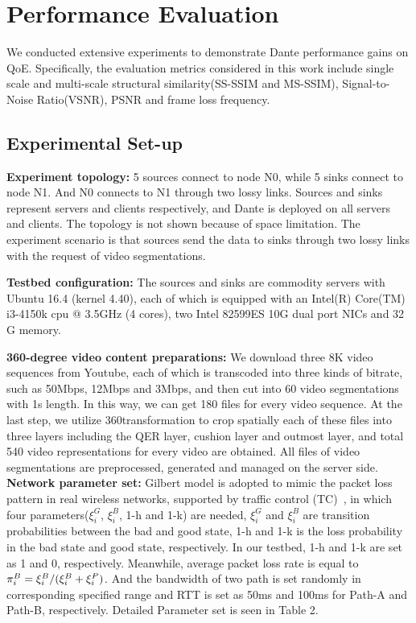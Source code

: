 \section{Performance Evaluation}
We conducted extensive experiments to demonstrate Dante performance gains on QoE. Specifically, the evaluation metrics considered in this work include single scale and multi-scale structural similarity(SS-SSIM and MS-SSIM), Signal-to-Noise Ratio(VSNR), PSNR and frame loss frequency. 

\subsection{Experimental Set-up}
\textbf{Experiment topology:} 5 sources connect to node N0, while 5 sinks connect to node N1. And N0 connects to N1 through two lossy links. Sources and sinks represent servers and clients respectively, and Dante is deployed on all servers and clients. The topology is not shown because of space limitation. The experiment scenario is that sources send the data to sinks through two lossy links with the request of video segmentations.

\textbf{Testbed configuration:} The sources and sinks are commodity servers with Ubuntu 16.4 (kernel 4.40), each of which is equipped with an Intel(R) Core(TM) i3-4150k cpu @ 3.5GHz (4 cores), two Intel 82599ES 10G dual port NICs and 32 G memory.


\textbf{360-degree video content preparations:} We download three 8K video sequences from Youtube, each of which is transcoded into three kinds of bitrate, such as 50Mbps, 12Mbps and 3Mbps, and then cut into 60 video segmentations with 1s length. In this way, we can get 180 files for every video sequence. At the last step, we utilize 360transformation \cite{360Transformations} to crop spatially each of these files into three layers including the QER layer, cushion layer and outmost layer, and total 540 video representations for every video are obtained. All files of video segmentations are preprocessed, generated and managed on the server side.\\
\textbf{Network parameter set:} Gilbert model is adopted to mimic the packet loss pattern in real wireless networks, supported by traffic control (TC)~\cite{TC}, in which four parameters($\xi _i^G$, $\xi _i^B$, 1-h and 1-k) are needed, $\xi _i^G$ and $\xi _i^B$ are transition probabilities between the bad and good state, 1-h and 1-k is the loss probability in the bad state and good state, respectively. In our testbed, 1-h and 1-k are set as 1 and 0, respectively. Meanwhile, average packet loss rate is equal to $\pi _i^B = \xi _i^B/(\xi _i^B\\ + \xi _i^P)$. And the bandwidth of two path is set randomly in corresponding specified range and RTT is set as 50ms and 100ms for Path-A and Path-B, respectively. Detailed Parameter set is seen in Table 2. 

